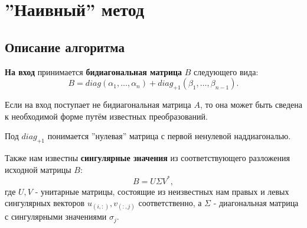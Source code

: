 \newpage
\section{''Наивный'' метод}




\subsection{Описание алгоритма}
\textbf{На вход} принимается \textbf{бидиагональная матрица} \(B\) следующего вида:
\[
        B= diag(\alpha_1,\dots,\alpha_n)+diag_{+1}(\beta_1,\dots,\beta_{n-1}).
\]

\begin{note}
    Если на вход поступает не бидиагональная матрица \(A\), то она может быть сведена к необходимой форме путём известных преобразований.
\end{note}

\begin{note}
    Под \(diag_{+1}\) понимается ''нулевая'' матрица с первой ненулевой наддиагональю.
\end{note}

Также нам известны \textbf{сингулярные значения} из соответствующего разложения исходной матрицы \(B\):
\begin{equation}
        B=U \Sigma V^*,
\end{equation}
где $U,V$ - унитарные матрицы, состоящие из неизвестных нам правых и левых сингулярных векторов $u_{(i,:)},v_{(:,j)}$ соответственно, а $\Sigma$ - диагональная матрица с сингулярными значениями \(\sigma_j\).

